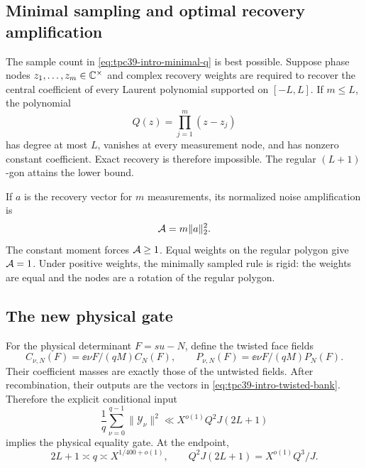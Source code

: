\subsection{Minimal sampling and optimal recovery amplification}

The sample count in \eqref{eq:tpc39-intro-minimal-q} is best possible.
Suppose phase nodes \(z_1,\ldots,z_m\in\mathbb C^\times\) and complex recovery
weights are required to recover the central coefficient of every Laurent
polynomial supported on \([-L,L]\).  If \(m\le L\), the polynomial
\begin{equation}
 Q(z)=\prod_{j=1}^{m}(z-z_j)
 \label{eq:tpc39-intro-annihilator}
\end{equation}
has degree at most \(L\), vanishes at every measurement node, and has
nonzero constant coefficient.  Exact recovery is therefore impossible.
The regular \((L+1)\)-gon attains the lower bound.

If \(a\) is the recovery vector for \(m\) measurements, its normalized
noise amplification is
\begin{equation}
 \mathcal A=m\|a\|_2^2.
 \label{eq:tpc39-intro-amplification}
\end{equation}
The constant moment forces \(\mathcal A\ge1\).  Equal weights on the regular
polygon give \(\mathcal A=1\).  Under positive weights, the minimally sampled
rule is rigid: the weights are equal and the nodes are a rotation of the
regular polygon.

\subsection{The new physical gate}

For the physical determinant \(F=su-N\), define the twisted face fields
\begin{equation}
 C_{\nu,N}(F)=\ee{\nu F/(qM)}C_N(F),
 \qquad
 P_{\nu,N}(F)=\ee{\nu F/(qM)}P_N(F).
 \label{eq:tpc39-intro-twisted-fields}
\end{equation}
Their coefficient masses are exactly those of the untwisted fields.
After recombination, their outputs are the vectors in
\eqref{eq:tpc39-intro-twisted-bank}.  Therefore the explicit conditional
input
\begin{equation}
 \frac1q\sum_{\nu=0}^{q-1}\|\mathscr Y_\nu\|^2
 \ll X^{o(1)}Q^2J(2L+1)
 \label{eq:tpc39-intro-twisted-gate}
\end{equation}
implies the physical equality gate.  At the endpoint,
\begin{equation}
 2L+1\asymp q\asymp X^{1/400+o(1)},
 \qquad
 Q^2J(2L+1)=X^{o(1)}Q^3/J.
 \label{eq:tpc39-intro-endpoint}
\end{equation}

